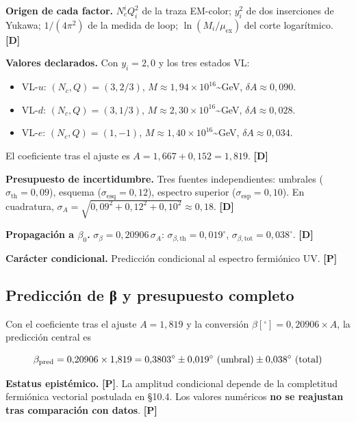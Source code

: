 ﻿\documentclass[11pt,letterpaper]{article}
\begin{document}
\textbf{Origen de cada factor.} $N_c^i Q_i^2$ de la traza EM-color; $y_i^2$ de dos inserciones de Yukawa; $1/(4\pi^2)$ de la medida de loop; $\ln(M_i/\mu_{\text{ex}})$ del corte logarítmico. \textbf{[D]}

\textbf{Valores declarados.} Con $y_i = 2{,}0$ y los tres estados VL:

\begin{itemize}[leftmargin=*]
\item VL-$u$: $(N_c, Q) = (3, 2/3)$, $M \approx 1{,}94 \times 10^{16}$\textasciitilde{}GeV, $\delta A \approx 0{,}090$.
\item VL-$d$: $(N_c, Q) = (3, 1/3)$, $M \approx 2{,}30 \times 10^{16}$\textasciitilde{}GeV, $\delta A \approx 0{,}028$.
\item VL-$e$: $(N_c, Q) = (1, -1)$, $M \approx 1{,}40 \times 10^{16}$\textasciitilde{}GeV, $\delta A \approx 0{,}034$.
\end{itemize}

El coeficiente tras el ajuste es $A = 1{,}667 + 0{,}152 = 1{,}819$. \textbf{[D]}

\textbf{Presupuesto de incertidumbre.} Tres fuentes independientes: umbrales ($\sigma_{\text{th}} = 0{,}09$), esquema ($\sigma_{\text{esq}} = 0{,}12$), espectro superior ($\sigma_{\text{esp}} = 0{,}10$). En cuadratura, $\sigma_A = \sqrt{0{,}09^2 + 0{,}12^2 + 0{,}10^2} \approx 0{,}18$. \textbf{[D]}

\textbf{Propagación a $\beta_0$.} $\sigma_\beta = 0{,}20906\,\sigma_A$: $\sigma_{\beta,\text{th}} = 0{,}019^\circ$, $\sigma_{\beta,\text{tot}} = 0{,}038^\circ$. \textbf{[D]}

\textbf{Carácter condicional.} Predicción condicional al espectro fermiónico UV. \textbf{[P]}
\subsection{Predicción de β y presupuesto completo}
Con el coeficiente tras el ajuste $A = 1{,}819$ y la conversión $\beta[^\circ] = 0{,}20906 \times A$, la predicción central es

\begin{equation*}
  \resizebox{\ifdim\width>\linewidth \linewidth\else\width\fi}{!}{$\displaystyle \beta_{\text{pred}} = 0{,}20906 \times 1{,}819 = 0{,}3803^\circ \pm 0{,}019^\circ \text{ (umbral)} \pm 0{,}038^\circ \text{ (total)}$}
\end{equation*}

\textbf{Estatus epistémico.} \textbf{[P]}. La amplitud condicional depende de la completitud fermiónica vectorial postulada en §10.4. Los valores numéricos \textbf{no se reajustan tras comparación con datos}. \textbf{[P]}
\end{document}

